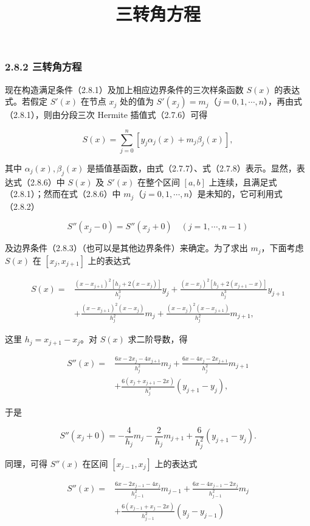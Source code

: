 \documentclass[
  10pt,
  fontset=fandol]{ctexart}
\title{三转角方程}
\author{}
\date{}
\begin{document}
\maketitle

\subsubsection{2.8.2 三转角方程}\label{ux4e09ux8f6cux89d2ux65b9ux7a0b}

现在构造满足条件（2.8.1）及加上相应边界条件的三次样条函数 \(S(x)\) 的表达式。若假定 \(S'(x)\) 在节点 \(x_j\) 处的值为 \(S'(x_j)=m_j\)（\(j=0,1,\cdots,n\)），再由式（2.8.1），则由分段三次 Hermite 插值式（2.7.6）可得

\[S(x)=\sum_{j=0}^n[y_j\alpha_j(x)+m_j\beta_j(x)],\tag{2.8.6}\]

其中 \(\alpha_j(x),\beta_j(x)\) 是插值基函数，由式（2.7.7）、式（2.7.8）表示。显然，表达式（2.8.6）中 \(S(x)\) 及 \(S'(x)\) 在整个区间 \([a,b]\) 上连续，且满足式（2.8.1）；然而在式（2.8.6）中 \(m_j\)（\(j=0,1,\cdots,n\)）是未知的，它可利用式（2.8.2）

\[S''(x_j-0)=S''(x_j+0)\quad(j=1,\cdots,n-1)\]

及边界条件（2.8.3）（也可以是其他边界条件）来确定。为了求出 \(m_j\)，下面考虑 \(S(x)\) 在 \([x_j,x_{j+1}]\) 上的表达式

\[\begin{aligned}
S(x)={}&\frac{(x-x_{j+1})^2[h_j+2(x-x_j)]}{h_j^3}y_j+\frac{(x-x_j)^2[h_j+2(x_{j+1}-x)]}{h_j^3}y_{j+1}\\
&+\frac{(x-x_{j+1})^2(x-x_j)}{h_j^2}m_j+\frac{(x-x_j)^2(x-x_{j+1})}{h_j^2}m_{j+1},
\end{aligned}\tag{2.8.7}\]

这里 \(h_j=x_{j+1}-x_j\)。对 \(S(x)\) 求二阶导数，得

\[\begin{aligned}
S''(x)={}&\frac{6x-2x_j-4x_{j+1}}{h_j^2}m_j+\frac{6x-4x_j-2x_{j+1}}{h_j^2}m_{j+1}\\
&+\frac{6(x_j+x_{j+1}-2x)}{h_j^3}(y_{j+1}-y_j),
\end{aligned}\]

于是

\[S''(x_j+0)=-\frac4{h_j}m_j-\frac2{h_j}m_{j+1}+\frac6{h_j^2}(y_{j+1}-y_j).\]

同理，可得 \(S''(x)\) 在区间 \([x_{j-1},x_j]\) 上的表达式

\[\begin{aligned}
S''(x)={}&\frac{6x-2x_{j-1}-4x_j}{h_{j-1}^2}m_{j-1}+\frac{6x-4x_{j-1}-2x_j}{h_{j-1}^2}m_j\\
&+\frac{6(x_{j-1}+x_j-2x)}{h_{j-1}^2}(y_j-y_{j-1})
\end{aligned}\]
\end{document}
